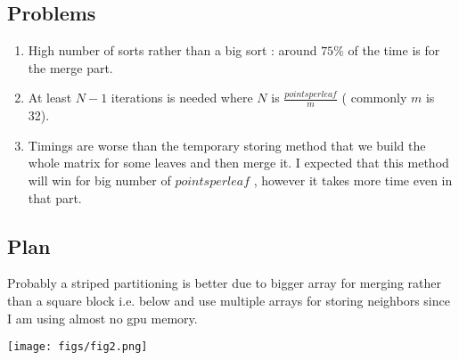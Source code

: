 \documentclass{article}
\begin{document}
\subsection{Problems}
\begin{enumerate}
    \item High number of sorts rather than a big sort : around $75 \%$ of the time is for the merge part. 
    \item At least $N-1$ iterations is needed where $N$ is $\frac{pointsperleaf}{m}$ ( commonly $m$ is 32).
    \item Timings are worse than the temporary storing method that we build the whole matrix for some leaves 
    and then merge it. I expected that this method will win for big number of $pointsperleaf$ , however it takes more time even 
    in that part. 
\end{enumerate}

\subsection{Plan} 
Probably a striped partitioning is better due to bigger array for merging rather than a square block i.e. below and use multiple 
arrays for storing neighbors since I am using almost no gpu memory.   

\begin{center}
    \texttt{[image: figs/fig2.png]}
\end{center}
\end{document}
